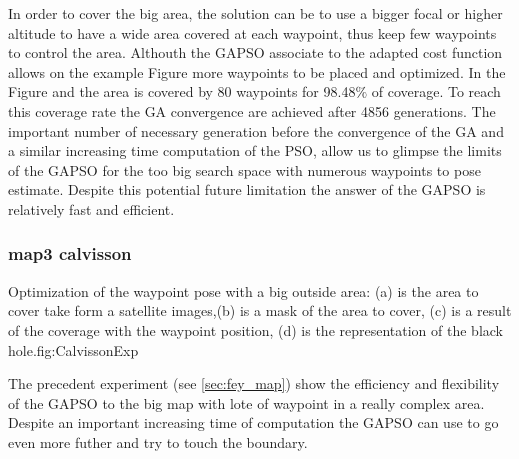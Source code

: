 In order to cover the big area, the solution can be to use a bigger focal or higher altitude to have a wide area covered at each waypoint, thus keep few waypoints to control the area. Althouth the GAPSO associate to the adapted cost function allows on the example Figure  more waypoints to be placed and optimized. 
 In the Figure  and  the area is covered by 80 waypoints for 98.48$\%$ of coverage. To reach this coverage rate the GA convergence are achieved after 4856 generations. The important number of necessary generation before the convergence of the GA and a similar  increasing time computation of the PSO, allow us to glimpse the limits of the GAPSO for the too big search space with numerous waypoints to pose estimate. Despite this potential future limitation the answer of the GAPSO is relatively fast and efficient.\\
 

		\subsubsection{map3 calvisson}
\begin{mfigures}[!]{ Optimization of the waypoint pose with a big outside area: (a) is the area to cover take form a satellite images,(b) is a mask of the area to cover, (c) is a result of the coverage with the waypoint position, (d) is the representation of the black hole.}{fig:CalvissonExp} \centering
{}
\hspace{1cm}
\hspace{1cm}
\tabsimuposeCalvisson
\end{mfigures}	

The precedent experiment (see \ref{sec:fey_map}) show the efficiency and flexibility of the GAPSO  to the big map with lote of waypoint in a really complex area. Despite an important increasing time of computation the GAPSO can use to go even more futher  and try to touch the boundary.  

